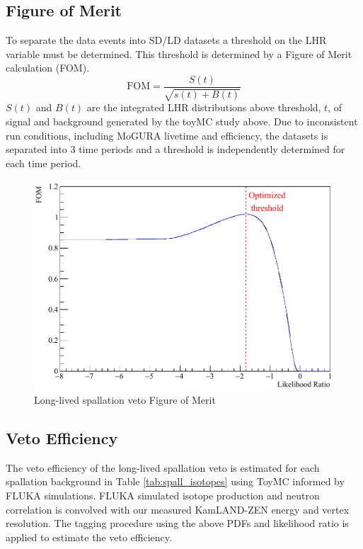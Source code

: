 \subsection*{Figure of Merit}
To separate the data events into SD/LD datasets a threshold on the LHR variable must be determined. This threshold is determined by a Figure of Merit calculation (FOM).
\begin{equation}
	\text{FOM}=\frac{S(t)}{\sqrt{s(t)+B(t)}}
\end{equation}
$S(t)$ and $B(t)$ are the integrated LHR distributions above threshold, $t$, of signal and background generated by the toyMC study above. Due to inconsistent run conditions, including MoGURA livetime and efficiency, the datasets is separated into 3 time periods and a threshold is independently determined for each time period.
\begin{figure}[htb]
	\centering
	\includegraphics[scale=0.35]{FOM.png}
	\caption{Long-lived spallation veto Figure of Merit}
	\label{fig:FOM}
\end{figure}

\subsection*{Veto Efficiency}
The veto efficiency of the long-lived spallation veto is estimated for each spallation background in Table \ref{tab:spall_isotopes} using ToyMC informed by FLUKA simulations. FLUKA simulated isotope production and neutron correlation is convolved with our measured KamLAND-ZEN energy and vertex resolution. The tagging procedure using the above PDFs and likelihood ratio is applied to estimate the veto efficiency.

